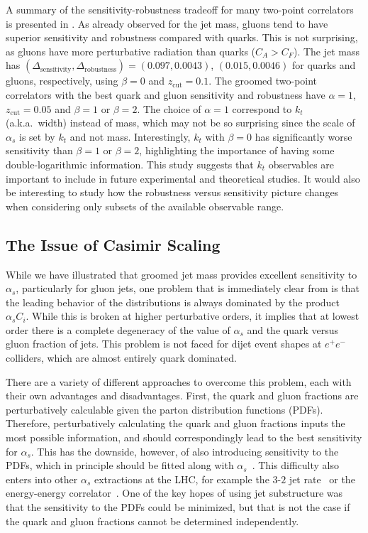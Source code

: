 A summary of the sensitivity-robustness tradeoff for many two-point correlators is presented in .  As already observed for the jet mass, gluons tend to have superior sensitivity and robustness compared with quarks.
%
This is not surprising, as gluons have more perturbative radiation than quarks ($C_A>C_F$).
%
The jet mass has $(\Delta_\text{sensitivity},\Delta_\text{robustness})=(0.097,0.0043)$, $(0.015,0.0046)$ for quarks and gluons, respectively, using $\beta=0$ and $z_\text{cut}=0.1$.
%
The groomed two-point correlators with the best quark and gluon sensitivity and robustness have $\alpha=1$, $z_\text{cut}=0.05$ and $\beta=1$ or $\beta=2$.
%
The choice of $\alpha=1$ correspond to $k_t$ (a.k.a.~width) instead of mass, which may not be so surprising since the scale of $\alpha_s$ is set by $k_t$ and not mass.
%
Interestingly, $k_t$ with $\beta=0$ has significantly worse sensitivity than $\beta=1$ or $\beta=2$, highlighting the importance of having some double-logarithmic information. 
%
This study suggests that $k_t$ observables are important to include in future experimental and theoretical studies.
%
It would also be interesting to study how the robustness versus sensitivity picture changes when considering only subsets of the available observable range.

\subsection{The Issue of Casimir Scaling}
\label{sec:casimir}

While we have illustrated that groomed jet mass provides excellent sensitivity to $\alpha_s$, particularly for gluon jets, one problem that is immediately clear from  is that the leading behavior of the distributions is always dominated by the product $\alpha_s C_i$.
%
While this is broken at higher perturbative orders, it implies that at lowest order there is a complete degeneracy of the value of $\alpha_s$ and the quark versus gluon fraction of jets.
%
This problem is not faced for dijet event shapes at $e^+e^-$ colliders, which are almost entirely quark dominated.

There are a variety of different approaches to overcome this problem, each with their own advantages and disadvantages.
%
First, the quark and gluon fractions are perturbatively calculable given the parton distribution functions (PDFs).
%
Therefore, perturbatively calculating the quark and gluon fractions inputs the most possible information, and should correspondingly lead to the best sensitivity for $\alpha_s$.
%
This has the downside, however, of also introducing sensitivity to the PDFs, which in principle should be fitted along with $\alpha_s$~\cite{Accardi:2016ndt}.
%
This difficulty also enters into other $\alpha_s$ extractions at the LHC, for example the $3$-$2$ jet rate~\cite{Chatrchyan:2013txa} or the energy-energy correlator~\cite{ATLAS:2015yaa,Aaboud:2017fml}.
%
One of the key hopes of using jet substructure was that the sensitivity to the PDFs could be minimized, but that is not the case if the quark and gluon fractions cannot be determined independently.

